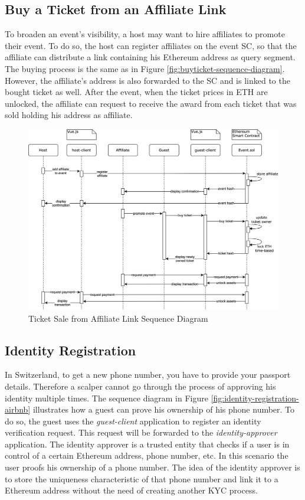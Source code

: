 \subsection{Buy a Ticket from an Affiliate Link}
To broaden an event's visibility, a host may want to hire affiliates to promote their event. To do so, the host can register affiliates on the event SC, so that the affiliate can distribute a link containing his Ethereum address as query segment. The buying process is the same as in Figure \ref{fig:buyticket-sequence-diagram}. However, the affiliate's address is also forwarded to the SC and is linked to the bought ticket as well. After the event, when the ticket prices in ETH are unlocked, the affiliate can request to receive the award from each ticket that was sold holding his address as affiliate.
\begin{figure}[H]
    \centering
    \includegraphics[width=16cm]{design/diagrams/BuyTicketFromAffiliateLink.png}
    \caption{Ticket Sale from Affiliate Link Sequence Diagram}
    \label{fig:buyticket-from-affiliate-diagram}
\end{figure}

\subsection{Identity Registration}
In Switzerland, to get a new phone number, you have to provide your passport details. Therefore a scalper cannot go through the process of approving his identity multiple times. The sequence diagram in Figure \ref{fig:identity-registration-airbnb} illustrates how a guest can prove his ownership of his phone number. To do so, the guest uses the \textit{guest-client} application to register an identity verification request. This request will be forwarded to the \textit{identity-approver} application. The identity approver is a trusted entity that checks if a user is in control of a certain Ethereum address, phone number, etc. In this scenario the user proofs his ownership of a phone number.  The idea of the identity approver is to store the uniqueness characteristic of that phone number and link it to a Ethereum address without the need of creating another KYC process. 

